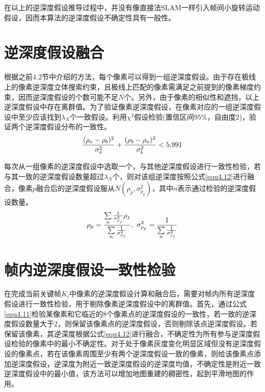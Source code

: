 在以上的逆深度假设推导过程中，并没有像直接法SLAM一样引入帧间小旋转运动假设，因而本算法的逆深度假设不确定性具有一般性。


\section{逆深度假设融合}
根据之前4.2节中介绍的方法，每个像素可以得到一组逆深度假设。由于存在极线上的像素逆深度立体搜索约束，且极线上匹配的像素需满足之前提到的像素梯度约束，因而逆深度假设的个数可能不足$N$个。另外，由于像素的相似性和遮挡，以上逆深度假设中存在离群值。为了验证像素逆深度假设，在像素对应的一组逆深度假设中至少应该找到$\lambda_N$个一致假设。利用$\chi^2$假设检验(置信区间$95\%$，自由度2)，验证两个逆深度假设分布的一致性。
\begin{equation}
\label{equ4.11}
{ (\rho_a - \rho_b)^2 \over \sigma_a^2 }+{ (\rho_b - \rho_a)^2 \over \sigma_b^2} < 5.991
\end{equation}

每次从一组像素的逆深度假设中选取一个，与其他逆深度假设进行一致性检验，若与其一致的逆深度假设数量超过$\lambda_N$个，则对该组逆深度按照公式\eqref{equ4.12}进行融合，像素$p$融合后的逆深度假设服从$N(\rho_p,\sigma_{\rho_p}^2)$，其中$n$表示通过检验的逆深度假设数量。
\begin{equation}
\label{equ4.12}
\rho_p = { {\sum\limits_n {1 \over \sigma_{\rho_j}^2} \rho_j } \over \sum\limits_n {1 \over \sigma_{\rho_j}^2}  }, \ 
\sigma_{\rho_p}^2 = {1 \over  \sum\limits_n { 1 \over \sigma_{\rho_j}^2}  }
\end{equation}


\section{帧内逆深度假设一致性检验}
在完成当前关键帧$K_i$中像素的逆深度假设计算和融合后，需要对帧内所有逆深度假设进行一致性检验，用于剔除像素逆深度假设中的离群值。首先，通过公式\eqref{equ4.11}检验某像素和它临近的8个像素点的逆深度假设的一致性，若一致的逆深度假设数量大于2，则保留该像素点的逆深度假设，否则剔除该点逆深度假设。若保留该像素，其逆深度根据公式\eqref{equ4.12}进行融合，不确定性为所有参与逆深度假设检验的像素中的最小不确定性。对于处于像素灰度变化明显区域但没有逆深度假设的像素点，若在该像素周围至少有两个逆深度假设一致的像素，则给该像素点添加逆深度假设，逆深度为附近一致逆深度假设的逆深度均值，不确定性是附近一致逆深度假设中的最小值，该方法可以增加地图重建的稠密性，起到平滑地图的作用。

